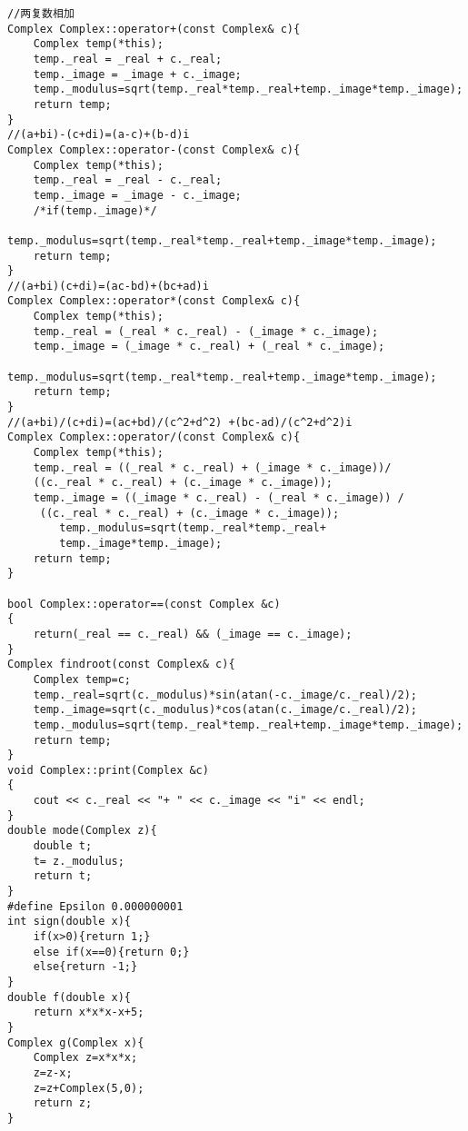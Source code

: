 \documentclass[a4paper,11pt,onecolumn,twoside]{article}
\begin{document}
\begin{appendices}
\begin{lstlisting}
//两复数相加
Complex Complex::operator+(const Complex& c){
    Complex temp(*this);
    temp._real = _real + c._real;
    temp._image = _image + c._image;
    temp._modulus=sqrt(temp._real*temp._real+temp._image*temp._image);
    return temp;
}
//(a+bi)-(c+di)=(a-c)+(b-d)i
Complex Complex::operator-(const Complex& c){
    Complex temp(*this);
    temp._real = _real - c._real;
    temp._image = _image - c._image;
    /*if(temp._image)*/
        temp._modulus=sqrt(temp._real*temp._real+temp._image*temp._image);
    return temp;
}
//(a+bi)(c+di)=(ac-bd)+(bc+ad)i
Complex Complex::operator*(const Complex& c){
    Complex temp(*this);
    temp._real = (_real * c._real) - (_image * c._image);
    temp._image = (_image * c._real) + (_real * c._image);
        temp._modulus=sqrt(temp._real*temp._real+temp._image*temp._image);
    return temp;
}
//(a+bi)/(c+di)=(ac+bd)/(c^2+d^2) +(bc-ad)/(c^2+d^2)i
Complex Complex::operator/(const Complex& c){
    Complex temp(*this);
    temp._real = ((_real * c._real) + (_image * c._image))/
    ((c._real * c._real) + (c._image * c._image));
    temp._image = ((_image * c._real) - (_real * c._image)) /
     ((c._real * c._real) + (c._image * c._image));
        temp._modulus=sqrt(temp._real*temp._real+
        temp._image*temp._image);
    return temp;
}

bool Complex::operator==(const Complex &c)
{
    return(_real == c._real) && (_image == c._image);
}
Complex findroot(const Complex& c){
    Complex temp=c;
    temp._real=sqrt(c._modulus)*sin(atan(-c._image/c._real)/2);
    temp._image=sqrt(c._modulus)*cos(atan(c._image/c._real)/2);
    temp._modulus=sqrt(temp._real*temp._real+temp._image*temp._image);
    return temp;
}
void Complex::print(Complex &c)
{
    cout << c._real << "+ " << c._image << "i" << endl;
}
double mode(Complex z){
    double t;
    t= z._modulus;
    return t;
}
#define Epsilon 0.000000001
int sign(double x){
    if(x>0){return 1;}
    else if(x==0){return 0;}
    else{return -1;}
}
double f(double x){
    return x*x*x-x+5;
}
Complex g(Complex x){
    Complex z=x*x*x;
    z=z-x;
    z=z+Complex(5,0);
    return z;
}


\end{lstlisting}
\end{appendices}
\end{document}
